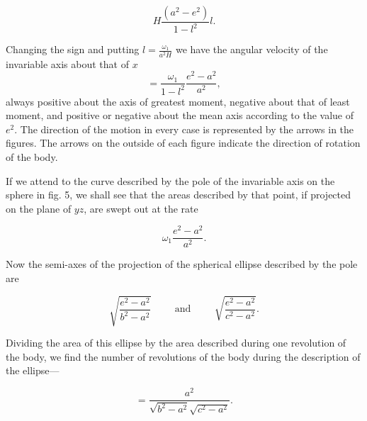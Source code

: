 \documentclass[12pt]{article}
\begin{document}
\begin{displaymath}
H\frac{(a^2 - e^2)}{1 - l^2}l.
\end{displaymath}

Changing the sign and putting $\displaystyle l =
\frac{\omega_1}{a^2H}$ we have the angular velocity of the invariable
axis about that of $x$
%
\begin{displaymath}
= \frac{\omega_1}{1 - l^2} \frac{e^2 - a^2}{a^2},
\end{displaymath}
%
always positive about the axis of greatest moment, negative about that
of least moment, and positive or negative about the mean axis
according to the value of $e^2$.  The direction of the motion in every
case is represented by the arrows in the figures.  The arrows on the
outside of each figure indicate the direction of rotation of the body.

\footnotemark[1]If we attend to the curve described by the pole of the
invariable axis on the sphere in fig. 5, we shall see that the areas
described by that point, if projected on the plane of $yz$, are swept
out at the rate

\begin{displaymath}
\omega_1 \frac{e^2 - a^2}{a^2}.
\end{displaymath}

Now the semi-axes of the projection of the spherical ellipse described
by the pole are

\begin{displaymath}
\sqrt{\frac{e^2 - a^2}{b^2 - a^2}}
  \hspace{1cm}\textrm{and}\hspace{1cm}
\sqrt{\frac{e^2 - a^2}{c^2 - a^2}}.
\end{displaymath}

Dividing the area of this ellipse by the area described during one
revolution of the body, we find the number of revolutions of the body
during the description of the ellipse---

\begin{displaymath}
= \frac{a^2}{\sqrt{b^2 - a^2}\sqrt{c^2 - a^2}}.
\end{displaymath}
\end{document}
